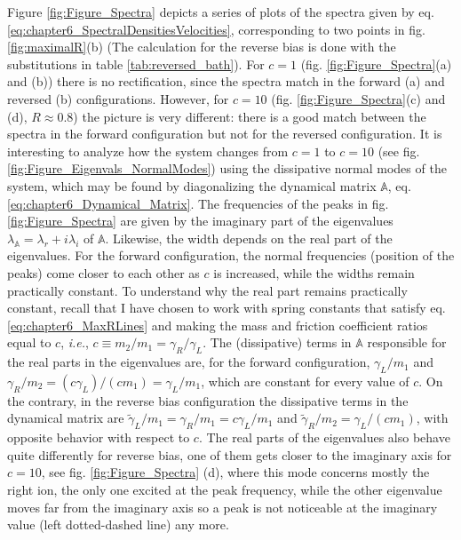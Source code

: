 %
Figure \ref{fig:Figure_Spectra} depicts a series of plots of the spectra given by eq. \eqref{eq:chapter6_SpectralDensitiesVelocities}, corresponding to two points in fig. \ref{fig:maximalR}(b) (The calculation for the reverse bias is done with the substitutions in table \ref{tab:reversed_bath}).
For $c=1$ (fig. \ref{fig:Figure_Spectra}(a) and (b)) there is no rectification, since the spectra match in the forward (a) and reversed (b) configurations. However, for $c=10$ (fig. \ref{fig:Figure_Spectra}(c) and (d), $R\approx 0.8$) the picture is very different: there is a good match between the spectra in the forward configuration but not for the reversed configuration. It is interesting to analyze how the system changes from $c=1$ to $c=10$ (see fig. \ref{fig:Figure_Eigenvals_NormalModes}) using the dissipative normal modes of the system, which may be found by diagonalizing the dynamical matrix $\mathbb{A}$, eq. \eqref{eq:chapter6_Dynamical_Matrix}. The frequencies of the peaks in fig. \ref{fig:Figure_Spectra} are given by the imaginary part of the eigenvalues $\lambda_\mathbb{A} = \lambda_r + i \lambda_i$ of $\mathbb{A}$. Likewise, the width depends on  the real part of the eigenvalues. For the forward configuration, the normal frequencies (position of the peaks) come closer to each other as $c$ is increased, while the widths remain practically constant. To understand why the real part remains practically constant, recall that I have chosen to work with spring constants that satisfy eq. \eqref{eq:chapter6_MaxRLines} and making the mass and friction coefficient ratios equal to $c$, \textit{i.e.}, $ c\equiv m_2/m_1 = \gamma_R/\gamma_L$. The (dissipative) terms in $\mathbb{A}$ responsible for the real parts in the eigenvalues are,
for the forward configuration,  $\gamma_L/m_1$ and $\gamma_R/m_2 = (c \gamma_L)/(c m_1) = \gamma_L/m_1$, which are constant for every value of $c$. On the contrary, in the reverse bias configuration  the dissipative terms in the dynamical matrix  are $\tilde{\gamma}_L/m_1 = \gamma_R/m_1 = c\gamma_L/m_1$ and $\tilde{\gamma}_R/m_2 = \gamma_L/ (c m_1)$, with opposite behavior with respect to $c$. The real parts of the eigenvalues
also behave quite differently for reverse bias, one of them gets closer to the imaginary axis for $c=10$,
see fig. \ref{fig:Figure_Spectra} (d), where this mode  concerns mostly the right ion,
the only one excited at the peak frequency, while the other eigenvalue  moves far from the imaginary axis so a peak is not noticeable
at the imaginary value (left dotted-dashed line) any more.

